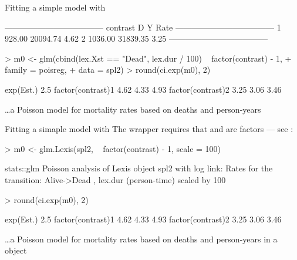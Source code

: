 \begin{frame}[fragile]{Fitting a simple model with }
\begin{Schunk}
\begin{Soutput}
 ------------------------------------ 
 contrast         D        Y    Rate  
 ------------------------------------ 
 1           928.00 20094.74    4.62  
 2          1036.00 31839.35    3.25  
 ------------------------------------ 
\end{Soutput}
\end{Schunk}
\begin{Schunk}
\begin{Sinput}
> m0 <- glm(cbind(lex.Xst == "Dead", lex.dur / 100) ~ factor(contrast) - 1,
+           family = poisreg,
+             data = spl2)
> round(ci.exp(m0), 2)
\end{Sinput}
\begin{Soutput}
                  exp(Est.) 2.5%
factor(contrast)1      4.62 4.33  4.93
factor(contrast)2      3.25 3.06  3.46
\end{Soutput}
\end{Schunk}
\small
\ldots a Poisson model for mortality rates based on deaths and person-years
\end{frame}

\begin{frame}[fragile]{Fitting a simaple model with }
\small
The wrapper  requires that  and 
are factors --- see :
\vspace*{-1ex}
\begin{Schunk}
\begin{Sinput}
> m0 <- glm.Lexis(spl2, ~ factor(contrast) - 1, scale = 100)
\end{Sinput}
\begin{Soutput}
stats::glm Poisson analysis of Lexis object spl2 with log link:
Rates for the transition:
Alive->Dead
, lex.dur (person-time) scaled by 100
\end{Soutput}
\begin{Sinput}
> round(ci.exp(m0), 2)
\end{Sinput}
\begin{Soutput}
                  exp(Est.) 2.5%
factor(contrast)1      4.62 4.33  4.93
factor(contrast)2      3.25 3.06  3.46
\end{Soutput}
\end{Schunk}
\small
\ldots a Poisson model for mortality rates based on deaths and
person-years in a  object
\end{frame}


